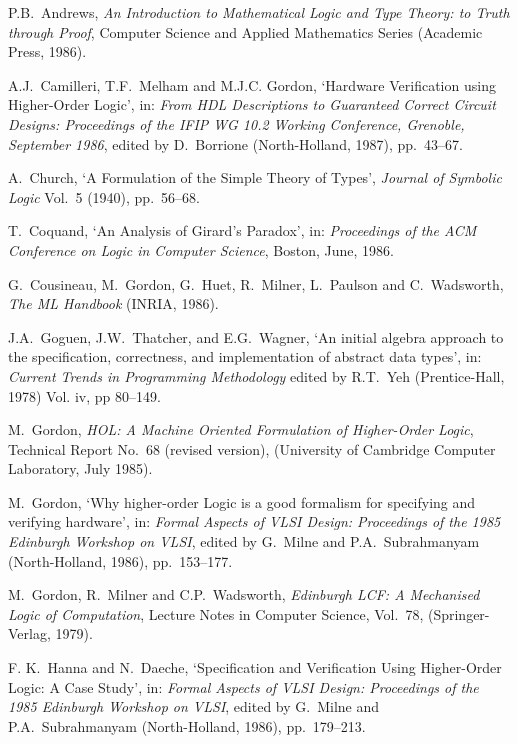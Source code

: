 \begin{thebibliography}{99}

P.B.\ Andrews,
{\it An Introduction to Mathematical Logic
     and Type Theory: to Truth through Proof},
Computer Science and Applied Mathematics Series
(Academic Press, 1986).

A.J.\ Camilleri, T.F.\ Melham and M.J.C. Gordon,
`Hardware Verification using Higher-Order Logic',
in: {\it From HDL Descriptions to Guaranteed Correct \mbox{Circuit}
Designs: Proceedings of the IFIP WG 10.2 Working Conference, Grenoble,
September 1986}, edited by D.\ Borrione (North-Holland, 1987), pp.\ 43--67.

A.\ Church,
`A Formulation of the Simple Theory of Types',
{\it Journal of Symbolic Logic} Vol.\ 5 (1940), pp.\ 56--68.

T.\ Coquand, `An Analysis of Girard's Paradox',
in: {\it Proceedings of the ACM Conference on
Logic in Computer Science\/}, Boston, June, 1986.

G.\ Cousineau, M.\ Gordon, G.\ Huet, R.\ Milner,
L.\ Paulson and C.\ Wadsworth,
{\it The ML Handbook} ({\small INRIA}, 1986).

J.A.\ Goguen, J.W.\ Thatcher, and E.G.\ Wagner,
`An initial algebra \mbox{approach} to the specification,
correctness, and implementation of abstract data types',
in: {\it Current Trends in Programming Methodology\/}
edited by R.T.\ Yeh (Prentice-Hall, 1978)
Vol. {\sc iv}, pp 80--149.

M.\ Gordon,
{\it HOL: A Machine Oriented Formulation of Higher-Order Logic},
Technical Report No.\ 68 (revised version),
(University of Cambridge Computer Laboratory, July 1985).

M.\ Gordon,
`Why higher-order Logic
is a good formalism for specifying and verifying hardware',
in: {\it Formal Aspects of VLSI Design: Proceedings of the 1985 Edinburgh
      Workshop on VLSI\/}, edited by G.\ Milne and
P.A.\ Subrahmanyam (North-Holland, 1986), pp.\ 153--177.

M.\ Gordon, R.\ Milner and C.P.\ Wadsworth,
{\it Edinburgh LCF: A Mechanised Logic of Computation},
Lecture Notes in Computer Science, Vol.\ 78,
(Springer-Verlag, 1979).

F. K.\ Hanna and N.\ Daeche,
`Specification and Verification Using Higher-Order Logic: A Case Study',
in: {\it Formal Aspects of VLSI Design: Proceedings of the 1985 Edinburgh
      Workshop on VLSI\/}, edited by G.\ Milne and
P.A.\ Subrahmanyam (North-Holland, 1986), pp.\ 179--213.


\end{thebibliography}
